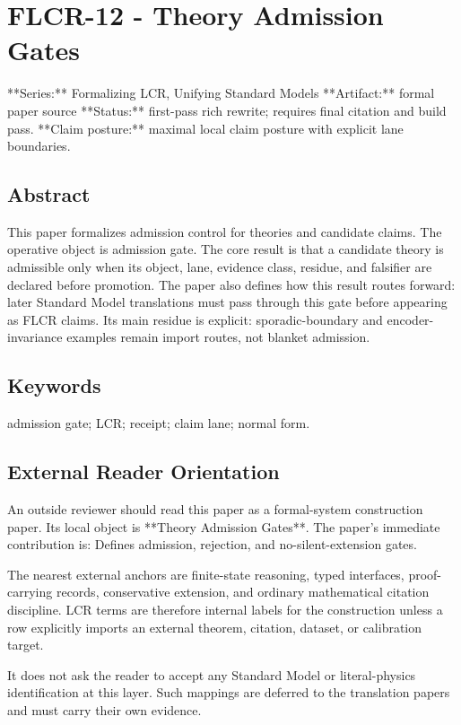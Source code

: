 \documentclass[11pt]{article}
\begin{document}
\section*{FLCR-12 - Theory Admission Gates}

**Series:** Formalizing LCR, Unifying Standard Models
**Artifact:** formal paper source
**Status:** first-pass rich rewrite; requires final citation and build pass.
**Claim posture:** maximal local claim posture with explicit lane boundaries.

\subsection*{Abstract}

This paper formalizes admission control for theories and candidate claims. The operative object is admission gate. The core result is that a candidate theory is admissible only when its object, lane, evidence class, residue, and falsifier are declared before promotion. The paper also defines how this result routes forward: later Standard Model translations must pass through this gate before appearing as FLCR claims. Its main residue is explicit: sporadic-boundary and encoder-invariance examples remain import routes, not blanket admission.

\subsection*{Keywords}

admission gate; LCR; receipt; claim lane; normal form.

\subsection*{External Reader Orientation}

An outside reviewer should read this paper as a formal-system construction paper. Its local object is **Theory Admission Gates**. The paper's immediate contribution is: Defines admission, rejection, and no-silent-extension gates.

The nearest external anchors are finite-state reasoning, typed interfaces, proof-carrying records, conservative extension, and ordinary mathematical citation discipline. LCR terms are therefore internal labels for the construction unless a row explicitly imports an external theorem, citation, dataset, or calibration target.

It does not ask the reader to accept any Standard Model or literal-physics identification at this layer. Such mappings are deferred to the translation papers and must carry their own evidence.
\end{document}
